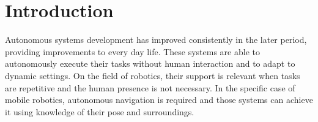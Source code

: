 

\chapter{Introduction}
\label{ch:introduction}









\noindent
Autonomous systems development has improved consistently in the later period, providing improvements to every day life.
These systems are able to autonomously execute their tasks without human interaction and to adapt to dynamic settings.
On the field of robotics, their support is relevant when tasks are repetitive and the human presence is not necessary.
In the specific case of mobile robotics, autonomous navigation is required and those systems can achieve it using knowledge of their pose and surroundings.

